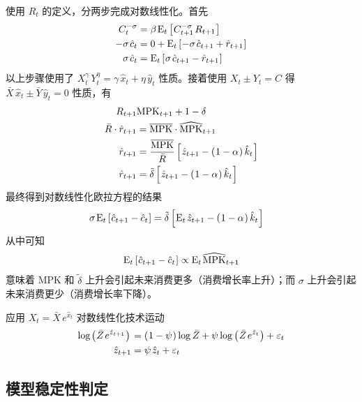 \myskip
{}

使用 \(R_t\) 的定义，分两步完成对数线性化。首先
\begin{align*}
    C_t^{-\sigma}&=\beta\,\meant\bks{C\nt^{-\sigma}\,R\nt}\\
    -\sigma\,\hat c_t&=0+\meant\bks{-\sigma\,\hat c\nt+\hat r\nt}\\
    \sigma\,\hat c_t&=\meant\bks{\sigma\,\hat c\nt-\hat r\nt}
\end{align*}
以上步骤使用了 \(X_t^\gamma\,Y_t^\eta=\gamma\,\hat x_t+\eta\,\hat y_t\) 性质。接着使用 \(X_t\pm Y_t=C\) 得 \(\bar X\,\hat x_t\pm\bar Y\,\hat y_t=0\) 性质，有
\begin{align*}
    R_{t+1}&\text{MPK}_{t+1}+1-\delta\\
    \bar R\cdot\hat r_{t+1}&=\overline{\text{MPK}} \cdot\widehat{\text{MPK}}_{t+1}\\
    \hat r_{t+1}&=\dfrac{\overline{\text{MPK}}}{\bar R}\left[\mspace{1mu}\hat z_{t+1}-\left(\mspace{1mu}1-\alpha\mspace{1mu}\right)\hat k_t\mspace{1mu}\right]\\
    \hat r_{t+1}&=\tilde\delta\left[\mspace{1mu}\hat z_{t+1}-\left(\mspace{1mu}1-\alpha\mspace{1mu}\right)\hat k_t\mspace{1mu}\right]
\end{align*}
最终得到对数线性化欧拉方程的结果
\begin{align*}
    \sigma\,\mean_t\bks{\hat c\nt-\hat c_t}&=\tilde\delta\bks{\mean_t\,\hat z\nt-\bka{1-\alpha}\hat k_t}
\end{align*}
从中可知
\begin{align*}
    \meant\bks{\hat c\nt-\hat c_t}\propto\meant\,\widehat{\n{MPK}}\nt
\end{align*}
意味着 MPK 和 \(\tilde\delta\) 上升会引起未来消费更多（消费增长率上升）；而 \(\sigma\) 上升会引起未来消费更少（消费增长率下降）。

\myskip
{}

应用 \(X_t=\bar X\,e^{\hat x_t}\) 对数线性化技术运动
\begin{align*}
    \log\pa{\bar Z\,e^{\hat z\nt}}&=\bka{1-\psi}\log\bar Z+\psi\log\bka{\bar Z\,e^{\hat z_t}}+\varepsilon_t\\
    \hat z\nt&=\psi\,\hat z_t+\varepsilon_t
\end{align*}

\subsection{模型稳定性判定}

